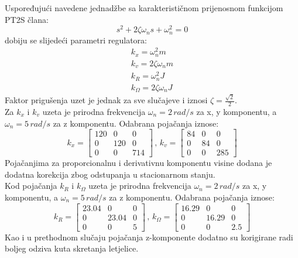 \documentclass[times, utf8, diplomski]{fer}
\begin{document}
	\noindent Uspoređujući navedene jednadžbe sa karakterističnom prijenosnom funkcijom PT2S člana: 
	\begin{equation}
		s^2 + 2 \zeta \omega_n s + \omega_n^2 = 0
	\end{equation}
	dobiju se slijedeći parametri regulatora:
	\begin{gather}
		k_x = \omega_n^2 m \\
		k_v = 2 \zeta \omega_n m \\
		k_R = \omega_n^2 J \\
		k_\Omega = 2 \zeta \omega_n J
	\end{gather}
	Faktor prigušenja uzet je jednak za sve slučajeve i iznosi $\zeta = \frac{\sqrt{2}}{2}$. \\
	Za $k_x$ i $k_v$ uzeta je prirodna frekvencija $\omega_n = 2 \, rad / s$ za x, y komponentu, a $\omega_n = 5 \, rad / s$ za z komponentu. Odabrana pojačanja iznose:
	\begin{equation}
		k_x = 
		\begin{bmatrix}
			120 & 0 & 0 \\
			0 & 120 & 0 \\
			0 & 0 &  714 
		\end{bmatrix}
		\, , \, 
		k_v = 
		\begin{bmatrix}
			84 & 0 & 0 \\
			0 & 84 & 0 \\
			0 & 0 & 285
		\end{bmatrix}
	\end{equation}
	Pojačanjima za proporcionalnu i derivativnu komponentu visine dodana je dodatna korekcija zbog odstupanja u stacionarnom stanju.\\
	Kod pojačanja $k_R$ i $k_\Omega$ uzeta je prirodna frekvencija $\omega_n = 2 \, rad/s$ za x, y komponentu, a $\omega_n = 5 \, rad/s$ za z komponentu. Odabrana pojačanja iznose:
	\begin{equation}
		k_R = 
		\begin{bmatrix}
			23.04 & 0 & 0 \\
			0 & 23.04 & 0 \\
			0 & 0 & 5
		\end{bmatrix}
		\, , \,
		k_\Omega = 
		\begin{bmatrix}
			16.29 & 0 & 0 \\
			0 & 16.29 & 0 \\
			0 & 0 & 2.5
		\end{bmatrix}
	\end{equation}
	Kao i u prethodnom slučaju pojačanja z-komponente dodatno su korigirane radi boljeg odziva kuta skretanja letjelice.
	
\end{document}
